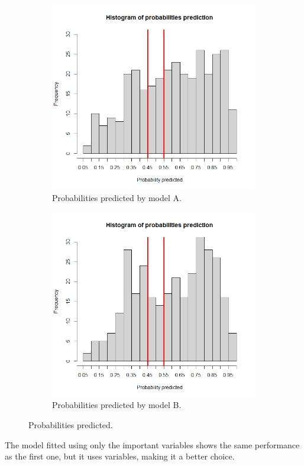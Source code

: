 \begin{figure}[h]
	\begin{subfigure}{.6\textwidth}
		\centering
		\includegraphics[width=0.7\linewidth]{ImageFiles/Classification/LogReg/probability_pred_all}
		\caption{Probabilities predicted by model A.}
		\label{fig:ProbPredA}
	\end{subfigure}
	\begin{subfigure}{.6\textwidth}
		\centering
		\includegraphics[width=0.7\linewidth]{ImageFiles/Classification/LogReg/probability_pred_imp}
		\caption{Probabilities predicted by model B.}
		\label{fig:ProbPredB}
	\end{subfigure}
	\caption{Probabilities predicted.}
	\label{fig:ProbPred}
\end{figure}

The model fitted using only the important variables shows the same performance as the first one, but it uses variables, making it a better choice.

